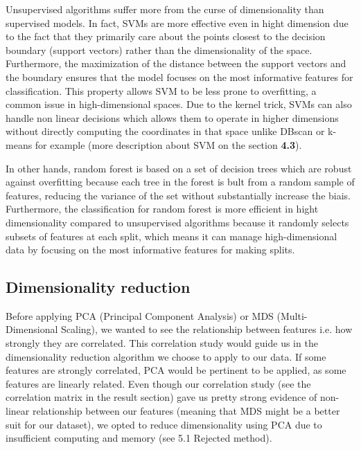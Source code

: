 \documentclass[twocolumn]{article}
\begin{document}
Unsupervised algorithms suffer more from the curse of dimensionality than supervised models. In fact, SVMs are more effective even in hight dimension due to the fact that they primarily care about the points closest to the decision boundary (support vectors) rather than the dimensionality of the space. Furthermore, the maximization of the distance between the support vectors and the boundary ensures that the model focuses on the most informative features for classification. This property allows SVM to be less prone to overfitting, a common issue in high-dimensional spaces. Due to the kernel trick, SVMs can also handle non linear decisions which allows them to operate in higher dimensions without directly computing the coordinates in that space unlike DBscan or k-means for example (more description about SVM on the section \textbf{4.3}).

In other hands, random forest is based on a set of decision trees which are robust against overfitting because each tree in the forest is bult from a random sample of features, reducing the variance of the set without substantially increase the biais. Furthermore, the classification for random forest is more efficient in hight dimensionality compared to unsupervised algorithms because it randomly selects subsets of features at each split, which means it can manage high-dimensional data by focusing on the most informative features for making splits.

\subsection{Dimensionality reduction}
Before applying PCA (Principal Component Analysis) or MDS (Multi-Dimensional Scaling), we wanted to see the relationship between features i.e. how strongly they are correlated. This correlation study would guide us in the dimensionality reduction algorithm we choose to apply to our data. If some features are strongly correlated, PCA would be pertinent to be applied, as some features are linearly related. Even though our correlation study (see the correlation matrix in the result section) gave us pretty strong evidence of non-linear relationship between our features (meaning that MDS might be a better suit for our dataset), we opted to reduce dimensionality using PCA due to insufficient computing and memory (see 5.1 Rejected method).
\end{document}
